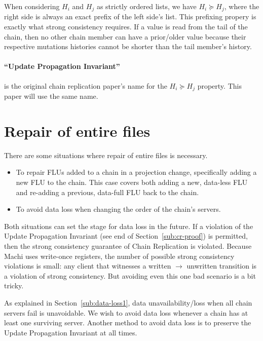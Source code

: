 \documentclass[preprint,10pt]{sigplanconf}
\begin{document}
When considering $H_i$ and $H_j$ as strictly ordered lists, we have 
$H_i \succeq H_j$, where the right side is always an exact prefix of the left
side's list.  This prefixing propery is exactly what strong
consistency requires.  If a value is read from the tail of the chain,
then no other chain member can have a prior/older value because their
respective mutations histories cannot be shorter than the tail
member's history.

\paragraph{``Update Propagation Invariant''}
is the original chain replication paper's name for the
$H_i \succeq H_j$ 
property.  This paper will use the same name.

\section{Repair of entire files}
\label{sec:repair-entire-files}

There are some situations where repair of entire files is necessary.

\begin{itemize}
\item To repair FLUs added to a chain in a projection change,
  specifically adding a new FLU to the chain.  This case covers both
  adding a new, data-less FLU and re-adding a previous, data-full FLU
  back to the chain.
\item To avoid data loss when changing the order of the chain's servers.
\end{itemize}

Both situations can set the stage for data loss in the future.
If a violation of the Update Propagation Invariant (see end of
Section~\ref{sub:cr-proof}) is permitted, then the strong consistency
guarantee of Chain Replication is violated.  Because Machi uses
write-once registers, the number of possible strong consistency
violations is small: any client that witnesses a written $\rightarrow$
unwritten transition is a violation of strong consistency.  But
avoiding even this one bad scenario is a bit tricky.

As explained in Section~\ref{sub:data-loss1}, data
unavailability/loss when all chain servers fail is unavoidable.  We
wish to avoid data loss whenever a chain has at least one surviving
server.  Another method to avoid data loss is to preserve the Update
Propagation Invariant at all times.
\end{document}
